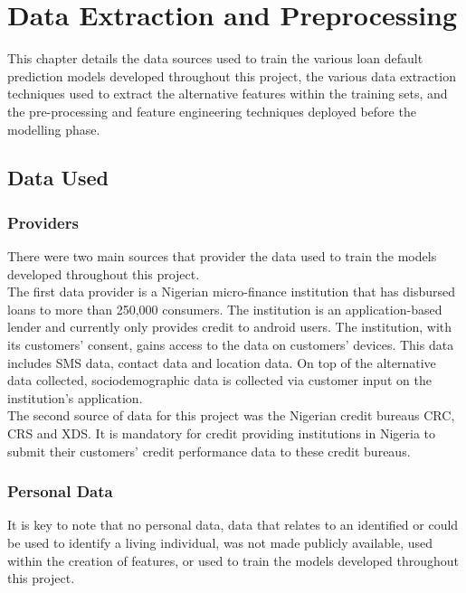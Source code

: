\chapter{Data Extraction and Preprocessing} 
\label{Chapter3}

This chapter details the data sources used to train the various loan default prediction models developed throughout this project, the various data extraction techniques used to extract the alternative features within the training sets, and the pre-processing and feature engineering techniques deployed before the modelling phase.   

\section{Data Used}

\subsection{Providers}

There were two main sources that provider the data used to train the models developed throughout this project. \\

The first data provider is a Nigerian micro-finance institution that has disbursed loans to more than 250,000 consumers. The institution is an application-based lender and currently only provides credit to android users. The institution, with its customers' consent, gains access to the data on customers' devices. This data includes SMS data, contact data and location data. On top of the alternative data collected, sociodemographic data is collected via customer input on the institution's application. \\

The second source of data for this project was the Nigerian credit bureaus CRC, CRS and XDS. It is mandatory for credit providing institutions in Nigeria to submit their customers' credit performance data to these credit bureaus.

\subsection{Personal Data}

It is key to note that no personal data, data that relates to an identified or could be used to identify a living individual, was not made publicly available, used within the creation of features, or used to train the models developed throughout this project. 

